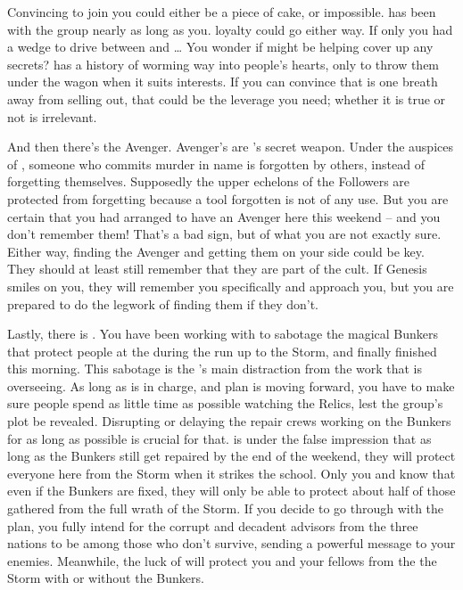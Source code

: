 \documentclass[char]{GL2020}
\begin{document}
Convincing \cChupInventor{} to join you could either be a piece of cake, or impossible. \cChupInventor{} has been with the group nearly as long as you. \cChupInventor{\Their} loyalty could go either way. If only you had a wedge to drive between \cChupInventor{} and \cChupLeader{}\ldots{} You wonder if \cChupLeader{} might be helping \cChupInventor{} cover up any secrets? \cChupLeader{} has a history of worming \cChupLeader{\their} way into people's hearts, only to throw them under the wagon when it suits \cChupLeader{\their} interests. If you can convince \cChupInventor{} that \cChupLeader{} is one breath away from selling \cChupInventor{\them} out, that could be the leverage you need; whether it is true or not is irrelevant.

And then there's the Avenger. Avenger's are \cGenesis{}'s secret weapon. Under the auspices of \cGenesis{}, someone who commits murder in \cGenesis{\their} name is forgotten by others, instead of forgetting themselves. Supposedly the upper echelons of the Followers are protected from forgetting because a tool forgotten is not of any use. But you are certain that you had arranged to have an Avenger here this weekend -- and you don't remember them! That's a bad sign, but of what you are not exactly sure. Either way, finding the Avenger and getting them on your side could be key. They should at least still remember that they are part of the cult. If Genesis smiles on you, they will remember you specifically and approach you, but you are prepared to do the legwork of finding them if they don't.

Lastly, there is \cChupStudent{}. You have been working with \cChupStudent{\them} to sabotage the magical Bunkers that protect people at the \pSchool{} during the run up to the Storm, and finally finished this morning. This sabotage is the \pGoaties{}'s main distraction from the work that \cChupLeader{} is overseeing. As long as \cChupLeader{} is in charge, and \cChupLeader{\their} plan is moving forward, you have to make sure people spend as little time as possible watching the Relics, lest the group's plot be revealed. Disrupting or delaying the repair crews working on the Bunkers for as long as possible is crucial for that. \cChupStudent{} is under the false impression that as long as the Bunkers still get repaired by the end of the weekend, they will protect everyone here from the Storm when it strikes the school. Only you and \cChupLeader{} know that even if the Bunkers are fixed, they will only be able to protect about half of those gathered from the full wrath of the Storm. If you decide to go through with the plan, you fully intend for the corrupt and decadent advisors from the three nations to be among those who don't survive, sending a powerful message to your enemies. Meanwhile, the luck of \cGenesis{} will protect you and your fellows from the the Storm with or without the Bunkers. 
\end{document}

